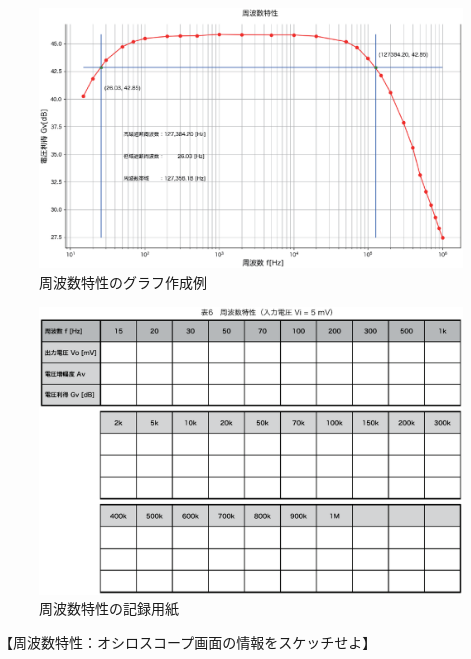 \documentclass[uplatex,a4paper,11pt,oneside,openany]{jsbook}
\begin{document}
\begin{figure}[H]
    \centering
     \includegraphics[keepaspectratio, scale=0.48, angle=0]
               {figs/eps/freqcharM1YExample.eps}
               \caption{周波数特性のグラフ作成例}
               \label{fig:freqcharM1Yd}
\end{figure}

\newpage

\begin{figure}[H]
  \centering
   \includegraphics[keepaspectratio, scale=0.76, angle=90]
               {figs/eps/kiroku.eps}
               \caption{周波数特性の記録用紙}
               \label{fig:22_2}
\end{figure}

\newpage

【周波数特性：オシロスコープ画面の情報をスケッチせよ】
\end{document}
